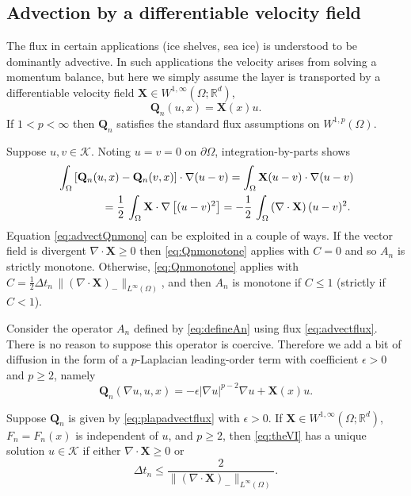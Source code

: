 \documentclass[final,onefignum]{siamart190516}
\newcommand\bQ{\mathbf{Q}}
\newcommand\bX{\mathbf{X}}
\newcommand{\Div}{\nabla\cdot}
\newcommand\eps{\epsilon}
\newcommand{\grad}{\nabla}
\newcommand\RR{\mathbb{R}}
\begin{document}
\subsection{Advection by a differentiable velocity field} \label{subsec:advect}  The flux in certain applications (ice shelves, sea ice) is understood to be dominantly advective.  In such applications the velocity arises from solving a momentum balance, but here we simply assume the layer is transported by a differentiable velocity field $\bX \in W^{1,\infty}(\Omega;\RR^d)$,
\begin{equation}
  \bQ_n(u,x) = \bX(x) u. \label{eq:advectflux}
\end{equation}
If $1<p<\infty$ then $\bQ_n$ satisfies the standard flux assumptions on $W^{1,p}(\Omega)$.

Suppose $u,v\in\mathcal{K}$.  Noting $u=v=0$ on $\partial \Omega$, integration-by-parts shows
\begin{align}
   &\int_\Omega \left[\bQ_n(u,x) - \bQ_n(v,x)\right] \cdot \grad (u - v) = \int_\Omega \bX (u-v) \cdot \grad (u - v)   \label{eq:advectQnmono} \\
   &\qquad\qquad = \frac{1}{2}\,\int_\Omega \bX \cdot \grad\left[ (u - v)^2 \right] = - \frac{1}{2}\,\int_\Omega \left(\Div\bX\right) (u - v)^2. \notag
\end{align}
Equation \eqref{eq:advectQnmono} can be exploited in a couple of ways.  If the vector field is divergent $\Div\bX\ge 0$ then \eqref{eq:Qnmonotone} applies with $C=0$ and so $A_n$ is strictly monotone.  Otherwise, \eqref{eq:Qnmonotone} applies with $C = \frac{1}{2}\Delta t_n\,\|(\Div\bX)_{-}\|_{L^\infty(\Omega)}$, and then $A_n$ is monotone if $C \le 1$ (strictly if $C < 1$).

Consider the operator $A_n$ defined by \eqref{eq:defineAn} using flux \eqref{eq:advectflux}.  There is no reason to suppose this operator is coercive.  Therefore we add a bit of diffusion in the form of a $p$-Laplacian leading-order term with coefficient $\eps>0$ and $p\ge 2$, namely
\begin{equation}
  \bQ_n(\grad u,u,x) = -\eps |\grad u|^{p-2} \grad u + \bX(x) u.   \label{eq:plapadvectflux}
\end{equation}

\begin{theorem}  \label{thm:plapadvectwellposed}  Suppose $\bQ_n$ is given by \eqref{eq:plapadvectflux} with $\eps>0$.  If $\bX \in W^{1,\infty}(\Omega;\RR^d)$, $F_n=F_n(x)$ is independent of $u$, and $p\ge 2$, then \eqref{eq:theVI} has a unique solution $u\in\mathcal{K}$ if either $\Div \bX \ge 0$ or
\begin{equation}
  \Delta t_n \le \frac{2}{\|(\Div \bX)_-\|_{L^\infty(\Omega)}}. \label{eq:plapadvectdtcond}
\end{equation}
\end{theorem}
\end{document}
